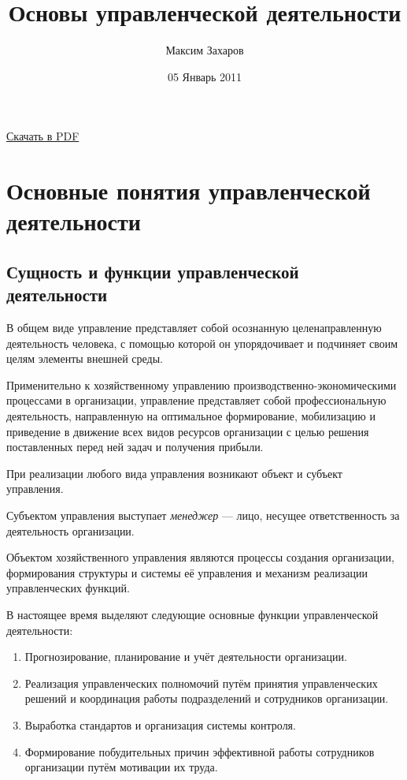 \documentclass[12pt, russian, oneside, article]{ncc}
\begin{document}
\title{Основы управленческой деятельности}
\author{Максим Захаров}
\date{05 Январь 2011}
\maketitle

\setcounter{tocdepth}{3}
\tableofcontents
\vspace*{1cm}

\href{file:///home/maxim/Documents/Git/lectures/other/OUD_Lectures.pdf}{Скачать в PDF}

\section{Основные понятия управленческой деятельности}
\label{sec-1}
\subsection{Сущность и функции управленческой деятельности}
\label{sec-1_1}


В общем виде управление представляет собой осознанную целенаправленную деятельность человека, с помощью которой он упорядочивает и подчиняет своим целям элементы внешней среды.

Применительно к хозяйственному управлению производственно-экономическими процессами в организации, управление представляет собой профессиональную деятельность, направленную на оптимальное формирование, мобилизацию и приведение в движение всех видов ресурсов организации с целью решения поставленных перед ней задач и получения прибыли.

При реализации любого вида управления возникают объект и субъект управления.

Субъектом управления выступает \emph{менеджер} --- лицо, несущее ответственность за деятельность организации.

Объектом хозяйственного управления являются процессы создания организации, формирования структуры и системы её управления и механизм реализации управленческих функций.

В настоящее время выделяют следующие основные функции управленческой деятельности:
\begin{enumerate}
\item Прогнозирование, планирование и учёт деятельности организации.
\item Реализация управленческих полномочий путём принятия управленческих решений и координация работы подразделений и сотрудников организации.
\item Выработка стандартов и организация системы контроля.
\item Формирование побудительных причин эффективной работы сотрудников организации путём мотивации их труда.
\end{enumerate}
\end{document}
